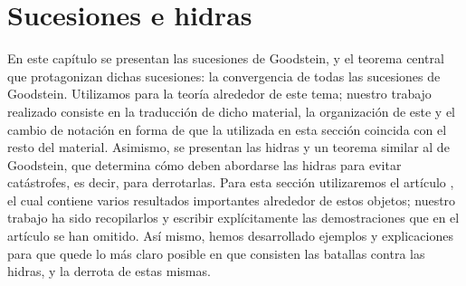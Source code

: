 \documentclass[12pt,a4paper]{book}
\numberwithin{thm}{chapter}
\theoremstyle{definition}
\begin{document}
\chapter{Sucesiones e hidras}
En este capítulo se presentan las sucesiones de Goodstein, y el teorema central que protagonizan dichas sucesiones: la convergencia de todas las sucesiones de Goodstein. Utilizamos {\cite[Capítulo 10.2]{SetTheory}} para la teoría alrededor de este tema; nuestro trabajo realizado consiste en la traducción de dicho material, la organización de este y el cambio de notación en forma de que la utilizada en esta sección coincida con el resto del material. 
Asimismo, se presentan las hidras y un teorema similar al de Goodstein, que determina cómo deben abordarse las hidras para evitar catástrofes, es decir, para derrotarlas. Para esta sección utilizaremos el artículo {\cite{Goodstein}}, el cual contiene varios resultados importantes alrededor de estos objetos; nuestro trabajo ha sido recopilarlos y escribir explícitamente las demostraciones que en el artículo se han omitido. Así mismo, hemos desarrollado ejemplos y explicaciones para que quede lo más claro posible en que consisten las batallas contra las hidras, y la derrota de estas mismas.



\end{document}
